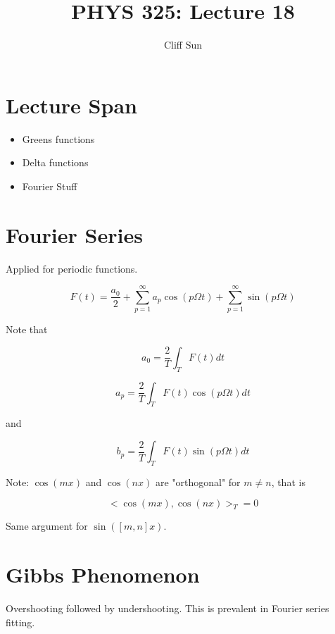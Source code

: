 \documentclass{article}
\title{PHYS 325: Lecture 18}
\author{Cliff Sun}
\newtheorem{one minute paper}[theorem]{One Minute Paper}
\begin{document}
\maketitle

\section*{Lecture Span}
\begin{itemize}
    \item Greens functions
    \item Delta functions
    \item Fourier Stuff
\end{itemize}

\section*{Fourier Series}

Applied for periodic functions.

\begin{equation}
    F(t) = \frac{a_0}{2} + \sum_{p=1}^{\infty}a_p\cos(p\Omega t) + \sum_{p=1}^{\infty}\sin(p\Omega t)
\end{equation}

Note that 

\begin{equation}
    a_0 = \frac{2}{T}\int_{T}F(t)dt
\end{equation}

\begin{equation}
    a_p = \frac{2}{T}\int_T F(t)\cos(p\Omega t)dt
\end{equation}

and 

\begin{equation}
    b_p = \frac{2}{T}\int_TF(t)\sin(p\Omega t)dt
\end{equation}

Note: $\cos(mx)$ and $\cos(nx)$ are "orthogonal" for $m \neq n$, that is 

\begin{equation}
    <\cos(mx), \cos(nx)>_T = 0
\end{equation}

Same argument for $\sin([m,n]x)$.

\section*{Gibbs Phenomenon}

Overshooting followed by undershooting. This is prevalent in Fourier series fitting. 
\end{document}
